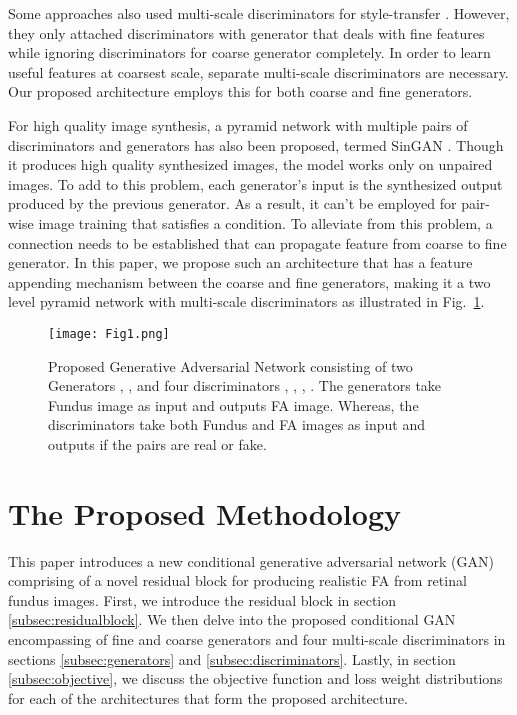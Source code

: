 \documentclass[runningheads]{llncs}
\begin{document}
Some approaches also used multi-scale discriminators for style-transfer \cite{wang2018high}. However, they only attached discriminators with generator that deals with fine features while ignoring discriminators for coarse generator completely. In order to learn useful features at coarsest scale, separate multi-scale discriminators are necessary. Our proposed architecture employs this for both coarse and fine generators. 

For high quality image synthesis, a pyramid network with multiple pairs of discriminators and generators has also been proposed, termed SinGAN \cite{shaham2019singan}. Though it produces high quality synthesized images, the model works only on unpaired images. To add to this problem, each generator's input is the synthesized output produced by the previous generator. As a result, it can't be employed for pair-wise image training that satisfies a condition. To alleviate from this problem, a connection needs to be established that can propagate feature from coarse to fine generator. In this paper, we propose such an architecture that has a feature appending mechanism between the coarse and fine generators, making it a two level pyramid network with multi-scale discriminators as illustrated in Fig.~\ref{fig1}. 

\begin{figure}[htb]
    \centering
    \texttt{[image: Fig1.png]}
    \caption{Proposed Generative Adversarial Network consisting of two Generators , , and four discriminators , , , . The generators take Fundus image as input and outputs FA image. Whereas, the discriminators take both Fundus and FA images as input and outputs if the pairs are real or fake. }
    \label{fig1}
\end{figure}

\section{The Proposed Methodology}
This paper introduces a new conditional generative adversarial network (GAN) comprising of a novel residual block for producing realistic FA from retinal fundus images. First, we introduce the residual block in section \ref{subsec:residualblock}. We then delve into the proposed conditional GAN encompassing of fine and coarse generators and four multi-scale discriminators in sections \ref{subsec:generators} and \ref{subsec:discriminators}. Lastly, in section \ref{subsec:objective}, we discuss the objective function and loss weight distributions for each of the architectures that form the proposed architecture.
\end{document}
